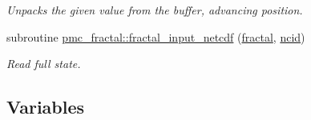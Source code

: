 \begin{DoxyCompactItemize}
\begin{DoxyCompactList}\small\item\em Unpacks the given value from the buffer, advancing position. \end{DoxyCompactList}\item 
subroutine \mbox{\hyperlink{namespacepmc__fractal_a877461eecd82d72d4084ef6ce9069bdd}{pmc\+\_\+fractal\+::fractal\+\_\+input\+\_\+netcdf}} (\mbox{\hyperlink{fractal_8_f90_a949ba7f6f3ce672ed686152acedb28bf}{fractal}}, \mbox{\hyperlink{fractal_8_f90_a4e89f3f850921ff84a6dfce8b166ad50}{ncid}})
\begin{DoxyCompactList}\small\item\em Read full state. \end{DoxyCompactList}\end{DoxyCompactItemize}
\subsection*{Variables}
